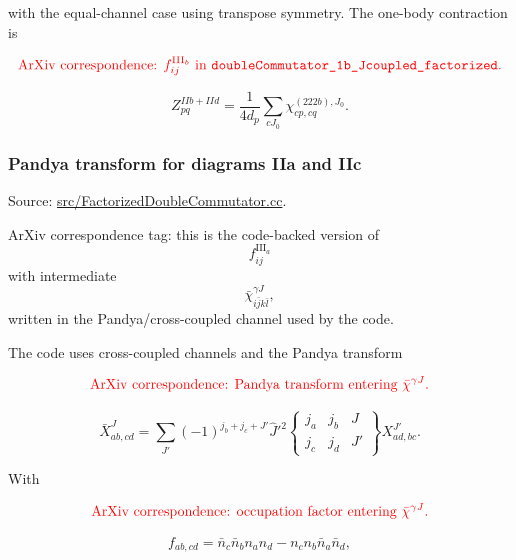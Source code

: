 \documentclass[
]{article}
\begin{document}
with the equal-channel case using transpose symmetry. The one-body
contraction is

\begin{equation}
{\color{red}\text{ArXiv correspondence: }f^{\mathrm{III}_b}_{ij}\text{ in }\texttt{doubleCommutator\_1b\_Jcoupled\_factorized}.}
\end{equation}

\begin{equation}
Z^{IIb+IId}_{pq}
=\frac{1}{4d_p}\sum_{cJ_0}\chi^{(222b),J_0}_{cp,cq} .
\end{equation}

\subsubsection{Pandya transform for diagrams IIa and
IIc}\label{pandya-transform-for-diagrams-iia-and-iic}

Source:
\href{../src/FactorizedDoubleCommutator.cc\#L546-L801}{src/FactorizedDoubleCommutator.cc}.

ArXiv correspondence tag: this is the code-backed version of \begin{equation}
f^{\mathrm{III}_a}_{ij}
\end{equation} with intermediate \begin{equation}
\bar\chi^{\gamma J}_{i\bar j k\bar l},
\end{equation} written in the Pandya/cross-coupled channel used by the code.

The code uses cross-coupled channels and the Pandya transform

\begin{equation}
{\color{red}\text{ArXiv correspondence: Pandya transform entering }\bar\chi^{\gamma J}.}
\end{equation}

\begin{equation}
\bar X^J_{ab,cd}
=\sum_{J'}(-1)^{j_b+j_c+J'}\hat J'^2
\begin{Bmatrix} j_a&j_b&J\\ j_c&j_d&J'\end{Bmatrix}
X^{J'}_{ad,bc} .
\end{equation}

With

\begin{equation}
{\color{red}\text{ArXiv correspondence: occupation factor entering }\bar\chi^{\gamma J}.}
\end{equation}

\begin{equation}
f_{ab,cd}=\bar n_c\bar n_b n_a n_d-n_c n_b\bar n_a\bar n_d,
\end{equation}
\end{document}
